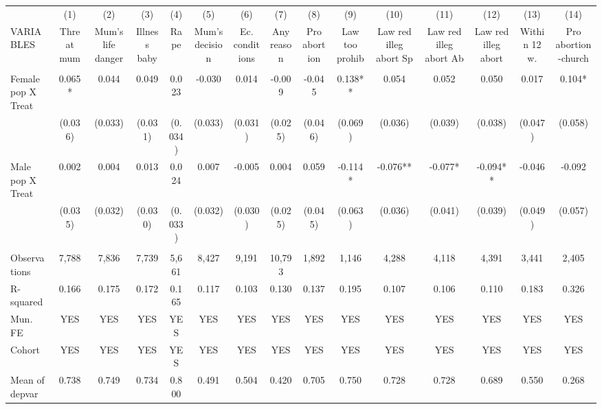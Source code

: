 \begin{tabular}{lcccccccccccccc} \hline
 & (1) & (2) & (3) & (4) & (5) & (6) & (7) & (8) & (9) & (10) & (11) & (12) & (13) & (14) \\
VARIABLES & Threat mum & Mum's life danger & Illness baby & Rape & Mum's decision & Ec. conditions & Any reason & Pro abortion & Law too prohib & Law red illeg abort Sp & Law red illeg abort Ab & Law red illeg abort & Within 12 w. & Pro abortion-church \\ \hline
 &  &  &  &  &  &  &  &  &  &  &  &  &  &  \\
Female pop X Treat & 0.065* & 0.044 & 0.049 & 0.023 & -0.030 & 0.014 & -0.009 & -0.045 & 0.138** & 0.054 & 0.052 & 0.050 & 0.017 & 0.104* \\
 & (0.036) & (0.033) & (0.031) & (0.034) & (0.033) & (0.031) & (0.025) & (0.046) & (0.069) & (0.036) & (0.039) & (0.038) & (0.047) & (0.058) \\
Male pop X Treat & 0.002 & 0.004 & 0.013 & 0.024 & 0.007 & -0.005 & 0.004 & 0.059 & -0.114* & -0.076** & -0.077* & -0.094** & -0.046 & -0.092 \\
 & (0.035) & (0.032) & (0.030) & (0.033) & (0.032) & (0.030) & (0.025) & (0.045) & (0.063) & (0.036) & (0.041) & (0.039) & (0.049) & (0.057) \\
 &  &  &  &  &  &  &  &  &  &  &  &  &  &  \\
Observations & 7,788 & 7,836 & 7,739 & 5,661 & 8,427 & 9,191 & 10,793 & 1,892 & 1,146 & 4,288 & 4,118 & 4,391 & 3,441 & 2,405 \\
R-squared & 0.166 & 0.175 & 0.172 & 0.165 & 0.117 & 0.103 & 0.130 & 0.137 & 0.195 & 0.107 & 0.106 & 0.110 & 0.183 & 0.326 \\
Mun. FE & YES & YES & YES & YES & YES & YES & YES & YES & YES & YES & YES & YES & YES & YES \\
Cohort & YES & YES & YES & YES & YES & YES & YES & YES & YES & YES & YES & YES & YES & YES \\
 Mean of depvar & 0.738 & 0.749 & 0.734 & 0.800 & 0.491 & 0.504 & 0.420 & 0.705 & 0.750 & 0.728 & 0.728 & 0.689 & 0.550 & 0.268 \\ \hline
\end{tabular}

